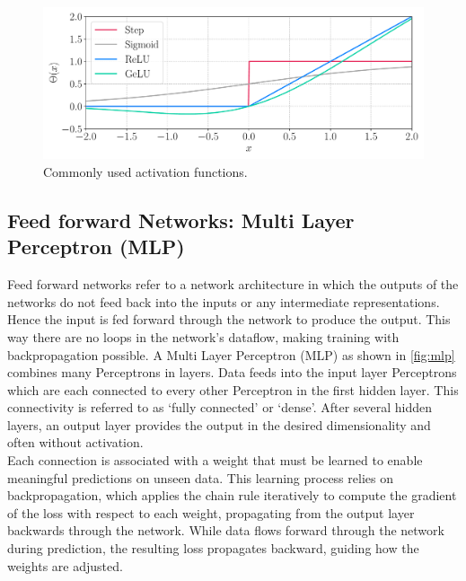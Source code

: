 \begin{figure}[H]
    \centering
    \includegraphics[width=\textwidth]{../fig/background/activation_functions.pdf}
    \caption{Commonly used activation functions.}
    \label{fig:activation_functions}
\end{figure}
\subsection{Feed forward Networks: Multi Layer Perceptron (MLP)}
\label{subsec:background_mlp}
Feed forward networks refer to a network architecture in which the outputs of the networks do not feed back into the inputs or any intermediate representations. Hence the input is fed forward through the network to produce the output. This way there are no loops in the network's dataflow, making training with backpropagation possible. A Multi Layer Perceptron (MLP) as shown in \autoref{fig:mlp} combines many Perceptrons in layers. Data feeds into the input layer Perceptrons which are each connected to every other Perceptron in the first hidden layer. This connectivity is referred to as `fully connected' or `dense'. After several hidden layers, an output layer provides the output in the desired dimensionality and often without activation.\\
Each connection is associated with a weight that must be learned to enable meaningful predictions on unseen data. This learning process relies on backpropagation, which applies the chain rule iteratively to compute the gradient of the loss with respect to each weight, propagating from the output layer backwards through the network. While data flows forward through the network during prediction, the resulting loss propagates backward, guiding how the weights are adjusted. \\
